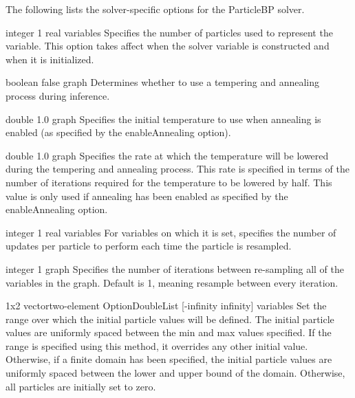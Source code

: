 The following lists the solver-specific options for the ParticleBP solver.



{integer}
{1}
{real variables}
{Specifies the number of particles used to represent the variable. This option takes affect when the solver variable is constructed and when it is initialized.}


{boolean}
{false}
{graph}
{Determines whether to use a tempering and annealing process during inference.}


{double}
{1.0}
{graph}
{Specifies the initial temperature to use when annealing is enabled (as specified by the enableAnnealing option).}


{double}
{1.0}
{graph}
{Specifies the rate at which the temperature will be lowered during the tempering and annealing process. This rate is specified in terms of the number of iterations required for the temperature to be lowered by half. This value is only used if annealing has been enabled as specified by the enableAnnealing option.}


{integer}
{1}
{real variables}
{For variables on which it is set, specifies the number of updates per particle to perform each time the particle is resampled.}


{integer}
{1}
{graph}
{Specifies the number of iterations between re-sampling all of the variables in the graph. Default is 1, meaning resample between every iteration.}


{\ifmatlab 1x2 vector\fi \ifjava two-element OptionDoubleList\fi}
{[-infinity infinity]}
{variables}
{Set the range over which the initial particle values will be defined. The initial particle values are uniformly spaced between the min and max values specified. If the range is specified using this method, it overrides any other initial value. Otherwise, if a finite domain has been specified, the initial particle values are uniformly spaced between the lower and upper bound of the domain. Otherwise, all particles are initially set to zero.}

